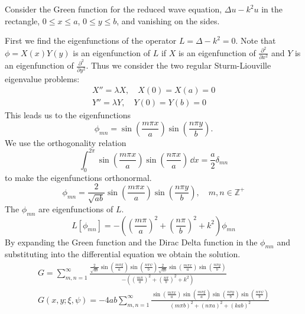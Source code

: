 \begin{Example}
  Consider the Green function for the reduced wave equation, 
  $\Delta u - k^2 u$ in the rectangle, $0 \leq x \leq a$, 
  $0 \leq y \leq b$, and vanishing on the sides.

  First we find the eigenfunctions of the operator
  $L = \Delta - k^2 = 0$.   Note that $\phi = X(x) Y(y)$ 
  is an eigenfunction of $L$ if $X$ is an eigenfunction of
  $\frac{\partial^2}{\partial x^2}$ and $Y$ is an eigenfunction of $\frac{\partial^2}{\partial y^2}$.
  Thus we consider the two regular Sturm-Liouville eigenvalue problems:
  \begin{gather*}
    X'' = \lambda X, \quad X(0) = X(a) = 0 \\
    Y'' = \lambda Y, \quad Y(0) = Y(b) = 0
  \end{gather*}
  This leads us to the eigenfunctions
  \[
  \phi_{m n} = \sin \left( \frac{m \pi x}{a} \right)
  \sin \left( \frac{n \pi y}{b} \right).
  \]
  We use the orthogonality relation
  \[
  \int_0^{2 \pi} \sin \left( \frac{m \pi x}{a} \right)
  \sin \left( \frac{n \pi x}{a} \right) \,\dd x 
  = \frac{a}{2} \delta_{m n}
  \]
  to make the eigenfunctions orthonormal.
  \[
  \phi_{m n} = \frac{2}{\sqrt{a b}} \sin \left( \frac{m \pi x}{a} \right)
  \sin \left( \frac{n \pi y}{b} \right), \quad
  m,n \in \mathbb{Z}^+
  \]
  The $\phi_{m n}$ are eigenfunctions of $L$.
  \[
  L \left[ \phi_{m n} \right] 
  = - \left( \left( \frac{m \pi}{a} \right)^2 
    + \left( \frac{n \pi}{b} \right)^2
    + k^2 \right) \phi_{m n}
  \]
  By expanding the Green function and the Dirac Delta function in 
  the $\phi_{m n}$ and substituting into the differential equation
  we obtain the solution.
  \begin{gather*}
    G = \sum_{m,n = 1}^\infty \frac{ \frac{2}{\sqrt{a b}} 
      \sin \left( \frac{m \pi \xi}{a} \right)
      \sin \left( \frac{n \pi \psi}{b} \right)
      \frac{2}{\sqrt{a b}} 
      \sin \left( \frac{m \pi x}{a} \right)
      \sin \left( \frac{n \pi y}{b} \right) }
    { - \left( \left( \frac{m \pi}{a} \right)^2 
        + \left( \frac{n \pi}{b} \right)^2
        + k^2 \right) } \\
    \boxed{
      G(x,y;\xi,\psi) = - 4 a b \sum_{m,n = 1}^\infty
      \frac{ \sin \left( \frac{m \pi x}{a} \right)
        \sin \left( \frac{m \pi \xi}{a} \right)
        \sin \left( \frac{n \pi y}{b} \right) 
        \sin \left( \frac{n \pi \psi}{b} \right) }
      { (m \pi b)^2 + (n \pi a)^2 + (k a b)^2 }
      }
  \end{gather*}
\end{Example}






